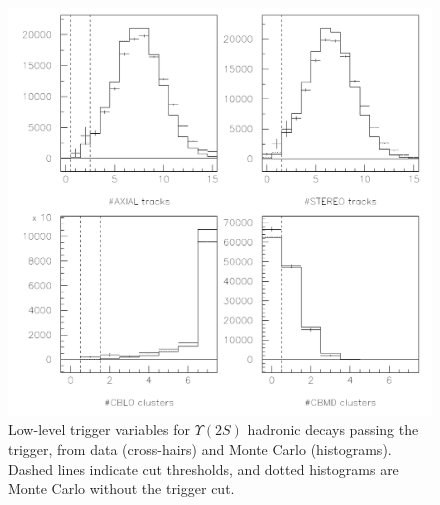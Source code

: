 \begin{figure}[p]
  \begin{center}
    \includegraphics[width=\linewidth]{plots/trigger_lowlevel_2s}
  \end{center}
  \caption{\label{trigger_lowlevel_2s} Low-level trigger variables for
    $\Upsilon(2S)$ hadronic decays passing the trigger, from data
    (cross-hairs) and Monte Carlo (histograms).  Dashed lines indicate
    cut thresholds, and dotted histograms are Monte Carlo without the
    trigger cut.}
\end{figure}

